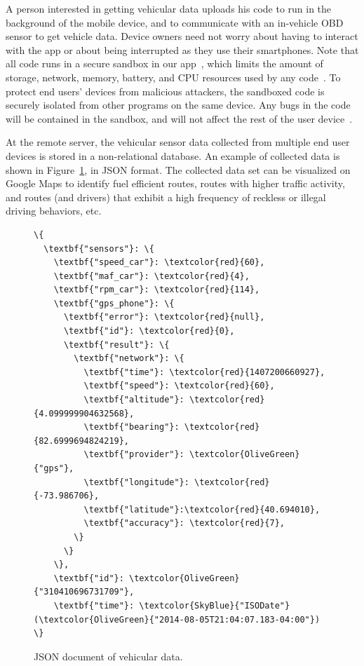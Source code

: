 A person interested in getting vehicular data uploads his  
code to run in the background of the mobile device, and to communicate 
with an in-vehicle OBD sensor to get vehicle data. Device owners need not worry about having to
interact with the app or about being interrupted as they use their smartphones. 
Note that all code runs in a secure sandbox in our 
app~\cite{sensor-app}, which limits the amount of storage, network, 
memory, battery, and CPU resources used by any code~\cite{Cappos_CCS_10}. 
To protect end users' devices from malicious attackers, the sandboxed 
code is securely isolated from other programs on the same device.
Any bugs in the code will be contained in the sandbox, and will not 
affect the rest of the user device~\cite{Cappos_CCS_10}. 
%

At the remote server, the vehicular sensor data collected from 
multiple end user devices is stored in a non-relational database. 
An example of 
collected data is shown in Figure~\ref{fig:json}, in JSON format.
The collected data set can be visualized on Google Maps to 
identify fuel efficient routes, routes with higher traffic activity, and routes 
(and drivers) that exhibit a high frequency 
of reckless or illegal driving behaviors, etc. 

\begin{figure}
\scriptsize 
\begin{Verbatim}
\{
  \textbf{"sensors"}: \{
    \textbf{"speed_car"}: \textcolor{red}{60},
    \textbf{"maf_car"}: \textcolor{red}{4},
    \textbf{"rpm_car"}: \textcolor{red}{114},
    \textbf{"gps_phone"}: \{
      \textbf{"error"}: \textcolor{red}{null},
      \textbf{"id"}: \textcolor{red}{0},
      \textbf{"result"}: \{
        \textbf{"network"}: \{
          \textbf{"time"}: \textcolor{red}{1407200660927},
          \textbf{"speed"}: \textcolor{red}{60},    
          \textbf{"altitude"}: \textcolor{red}{4.099999904632568},
          \textbf{"bearing"}: \textcolor{red}{82.6999694824219},
          \textbf{"provider"}: \textcolor{OliveGreen}{"gps"},
          \textbf{"longitude"}: \textcolor{red}{-73.986706},
          \textbf{"latitude"}:\textcolor{red}{40.694010},
          \textbf{"accuracy"}: \textcolor{red}{7},
        \}
      \}
    \},
    \textbf{"id"}: \textcolor{OliveGreen}{"310410696731709"},
    \textbf{"time"}: \textcolor{SkyBlue}{"ISODate"}(\textcolor{OliveGreen}{"2014-08-05T21:04:07.183-04:00"})
\}
\end{Verbatim}
\caption{JSON document of vehicular data.\label{fig:json}}
\end{figure}

